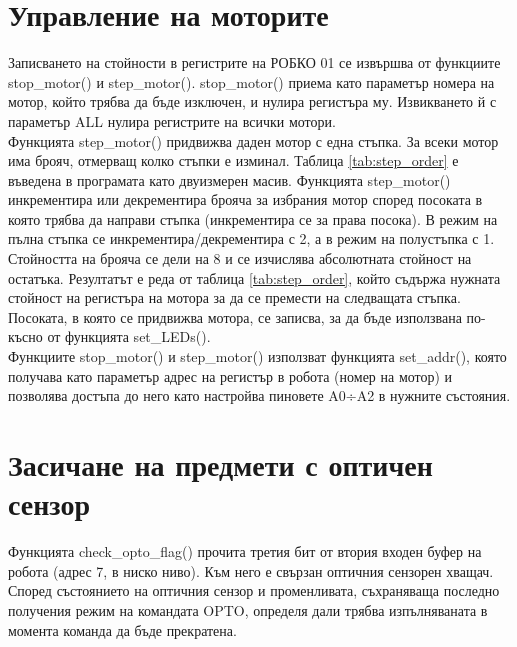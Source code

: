 \section{Управление на моторите}
\label{motor_cntrl_section}
Записването на стойности в регистрите на РОБКО 01 се извършва от функциите stop\_motor() и step\_motor(). stop\_motor() приема като параметър номера на мотор, който трябва да бъде изключен, и нулира регистъра му. Извикването й с параметър ALL нулира регистрите на всички мотори.\\
\indent{}
Функцията step\_motor() придвижва даден мотор с една стъпка. За всеки мотор има брояч, отмерващ колко стъпки е изминал. Таблица \ref{tab:step_order} е въведена в програмата като двуизмерен масив. Функцията step\_motor() инкрементира или декрементира брояча за избрания мотор според посоката в която трябва да направи стъпка (инкрементира се за права посока). В режим на пълна стъпка се инкрементира/декрементира с 2, а в режим на полустъпка с 1. Стойността на брояча се дели на 8 и се изчислява абсолютната стойност на остатъка. Резултатът е реда от таблица \ref{tab:step_order}, който съдържа нужната стойност на регистъра на мотора за да се премести на следващата стъпка. Посоката, в която се придвижва мотора, се записва, за да бъде използвана по-късно от функцията set\_LEDs().\\
\indent{}
Функциите stop\_motor() и step\_motor() използват функцията set\_addr(), която получава като параметър адрес на регистър в робота (номер на мотор) и позволява достъпа до него като настройва пиновете A0÷A2 в нужните състояния.
\section{Засичане на предмети с оптичен сензор}
\label{opto_cmd_section}
Функцията check\_opto\_flag() прочита третия бит от втория входен буфер на робота (адрес 7,  в ниско ниво). Към него е свързан оптичния сензорен хващач. Според състоянието на оптичния сензор и променливата, съхраняваща последно получения режим на командата OPTO, определя дали трябва изпълняваната в момента команда да бъде прекратена.